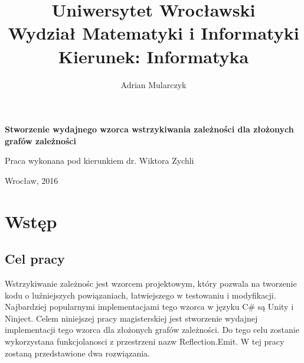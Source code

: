 \documentclass[12pt]{article}
\title{\LARGE{Uniwersytet Wrocławski}\\
\Large{Wydział Matematyki i Informatyki}\\
\large{Kierunek: Informatyka}}
\date{}
\begin{document}
\pagestyle{empty}

\begin{titlepage}
\maketitle
\thispagestyle{empty}


\begin{center}
\author{\LARGE{Adrian Mularczyk}}
\vspace{30pt}

\huge{\textbf{Stworzenie wydajnego wzorca wstrzykiwania zależności dla złożonych grafów zależności}}
\vspace{50pt}
\end{center}

\begin{flushright}
\large{Praca wykonana pod kierunkiem}
\large{dr. Wiktora Zychli}
\end{flushright}

\vfill
\begin{center}
\begin{large}
Wrocław, 2016
\end{large}
\end{center}
\end{titlepage}

\setlength{\parindent}{0pt}	%
\setlength{\parskip}{1.5ex} 
\renewcommand*{\figurename}{Rys.}
\renewcommand*{\tablename}{Tab.} 
\renewcommand{\captionsize}{\small}


\clearpage

\tableofcontents



\clearpage

\section{Wstęp}
\subsection{Cel pracy}
Wstrzykiwanie zależnośc jest wzorcem projektowym, który pozwala na tworzenie kodu o luźniejszych powiązaniach, łatwiejszego w testowaniu i modyfikacji. Najbardziej popularnymi implementacjami tego wzorca w języku C\# są Unity i Ninject. Celem niniejszej pracy magisterskiej jest stworzenie wydajnej implementacji tego wzorca dla złożonych grafów zależności. Do tego celu zostanie wykorzystana funkcjolanosci z przestrzeni nazw Reflection.Emit. W tej pracy zostaną przedstawione dwa rozwiązania.
\end{document}
